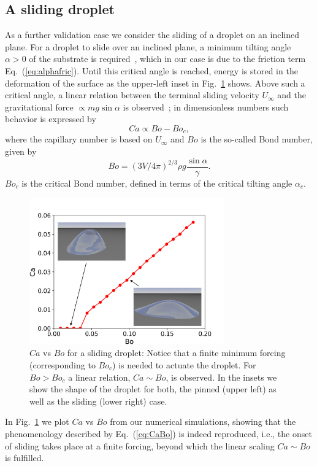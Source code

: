 \subsection{A sliding droplet}
As a further validation case we consider the sliding of a droplet on an inclined plane.
For a droplet to slide over an inclined plane, a minimum tilting angle $\alpha >0$ of the substrate is required~\cite{furmidgeStudiesPhaseInterfaces1962}, which in our case is due to the friction term Eq.~(\ref{eq:alphafric}). 
Until this critical angle is reached, energy is stored in the deformation of the surface as the upper-left inset in Fig.~\ref{fig:CaBo} shows. 
Above such a critical angle, a linear relation between the terminal sliding velocity $U_{\infty}$ and the gravitational force $\propto m g \sin \alpha$ is observed~\cite{podgorskiCornersCuspsPearls2001,kimSlidingLiquidDrops2002,sbragagliaSlidingDropsAlternating2014}; in dimensionless numbers such behavior is expressed by 
\begin{equation}\label{eq:CaBo}
  Ca \propto Bo - Bo_c,
\end{equation}
where the capillary number is based on $U_{\infty}$ and $Bo$ is the so-called Bond number, given by
\begin{equation}
  Bo = (3V/4\pi)^{2/3}\rho g \frac{\sin\alpha}{\gamma}.
\end{equation}
$Bo_c$ is the critical Bond number, defined in terms of the critical tilting angle $\alpha_c$.
  \begin{figure}
    \centering
    \includegraphics[width=0.75\textwidth]{graphics/Fig_7_Ca_Bo_true_with_pic.png}
    \caption{$Ca$ vs $Bo$ for a sliding droplet: Notice that a finite minimum forcing (corresponding to $Bo_c$) is needed to actuate the droplet. 
    For $Bo > Bo_c$ a linear relation, $Ca \sim Bo$, is observed. 
    In the insets we show the shape of the droplet for both, the pinned (upper left) as well as the sliding (lower right) case.
    }
    \label{fig:CaBo}
\end{figure}
In Fig.~\ref{fig:CaBo} we plot $Ca$ vs $Bo$ from our numerical simulations, showing that the phenomenology described by Eq.~(\ref{eq:CaBo}) is indeed reproduced, i.e., the onset of sliding takes place at a finite forcing, beyond which the linear scaling $Ca \sim Bo$ is fulfilled. 


